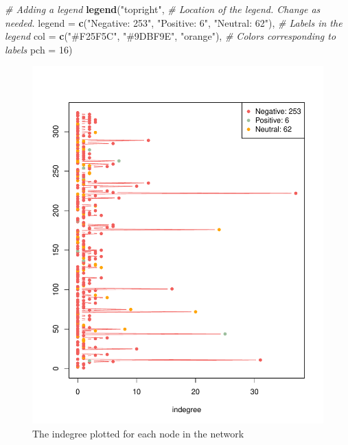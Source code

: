 \documentclass[
  man,floatsintext]{apa6}
\newenvironment{Shaded}{\begin{snugshade}}{\end{snugshade}}
\newcommand{\AttributeTok}[1]{\textcolor[rgb]{0.13,0.29,0.53}{#1}}
\newcommand{\CommentTok}[1]{\textcolor[rgb]{0.56,0.35,0.01}{\textit{#1}}}
\newcommand{\DecValTok}[1]{\textcolor[rgb]{0.00,0.00,0.81}{#1}}
\newcommand{\FunctionTok}[1]{\textcolor[rgb]{0.13,0.29,0.53}{\textbf{#1}}}
\newcommand{\NormalTok}[1]{#1}
\newcommand{\StringTok}[1]{\textcolor[rgb]{0.31,0.60,0.02}{#1}}
\begin{document}
\begin{Shaded}
\begin{Highlighting}[]
\CommentTok{\# Adding a legend}
\FunctionTok{legend}\NormalTok{(}\StringTok{"topright"}\NormalTok{, }\CommentTok{\# Location of the legend. Change as needed.}
       \AttributeTok{legend =} \FunctionTok{c}\NormalTok{(}\StringTok{"Negative: 253"}\NormalTok{, }
                  \StringTok{"Positive: 6"}\NormalTok{, }
                  \StringTok{"Neutral: 62"}\NormalTok{),  }\CommentTok{\# Labels in the legend}
       \AttributeTok{col =} \FunctionTok{c}\NormalTok{(}\StringTok{"\#F25F5C"}\NormalTok{, }
               \StringTok{"\#9DBF9E"}\NormalTok{, }
               \StringTok{"orange"}\NormalTok{), }\CommentTok{\# Colors corresponding to labels}
       \AttributeTok{pch =} \DecValTok{16}\NormalTok{)}
\end{Highlighting}
\end{Shaded}

\begin{figure}[H]
\includegraphics{SNA4DS_Report_files/figure-latex/indegree-plot-1} \caption{The indegree plotted for each node in the network}\label{fig:indegree-plot}
\end{figure}
\end{document}
